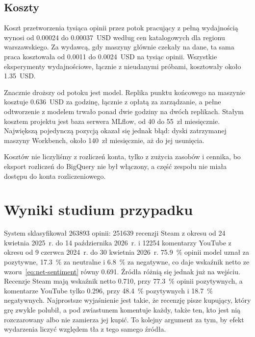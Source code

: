 \subsection{Koszty}
\label{sec:eval-costs}

Koszt przetworzenia tysiąca opinii przez potok pracujący z pełną wydajnością wynosi od \num{0.00024} do \num{0.00037}~USD według cen katalogowych dla regionu warszawskiego.
Za wydawcą, gdy maszyny głównie czekały na dane, ta sama praca kosztowała od \num{0.0011} do \num{0.0024}~USD na tysiąc opinii.
Wszystkie eksperymenty wydajnościowe, łącznie z nieudanymi próbami, kosztowały około \num{1.35}~USD.

Znacznie droższy od potoku jest model.
Replika punktu końcowego na maszynie  kosztuje \num{0.636}~USD za godzinę, łącznie z opłatą za zarządzanie, a pełne odtworzenie z modelem trwało ponad dwie godziny na dwóch replikach.
Stałym kosztem projektu jest baza serwera MLflow, od 40 do 55~zł miesięcznie.
Największą pojedynczą pozycją okazał się jednak błąd: dyski zatrzymanej maszyny Workbench, około 140~zł miesięcznie, aż do jej usunięcia.

Kosztów nie liczyliśmy z rozliczeń konta, tylko z zużycia zasobów i cennika, bo eksport rozliczeń do BigQuery nie był włączony, a część zespołu nie miała dostępu do konta rozliczeniowego.

\section{Wyniki studium przypadku}
\label{sec:eval-case-study}

System sklasyfikował \num{263893} opinii: \num{251639} recenzji Steam z okresu od 24 kwietnia 2025~r. do 14 października 2026~r. i \num{12254} komentarzy YouTube z okresu od 9 czerwca 2024~r. do 30 kwietnia 2026~r.
\qty{75.9}{\percent} opinii model uznał za pozytywne, \qty{17.3}{\percent} za neutralne i \qty{6.8}{\percent} za negatywne, co daje wskaźnik netto ze wzoru~\eqref{eq:net-sentiment} równy \num{0.691}.
Źródła różnią się jednak już na wejściu.
Recenzje Steam mają wskaźnik netto \num{0.710}, przy \qty{77.3}{\percent} opinii pozytywnych, a komentarze YouTube tylko \num{0.296}, przy \qty{48.4}{\percent} pozytywnych i \qty{18.7}{\percent} negatywnych.
Najprostsze wyjaśnienie jest takie, że recenzję pisze kupujący, który grę zwykle polubił, a pod zwiastunem komentuje każdy, także ten, kto jest nią rozczarowany albo nie zamierza jej kupić.
To kolejny argument za tym, by efekt wydarzenia liczyć względem tła z tego samego źródła.

